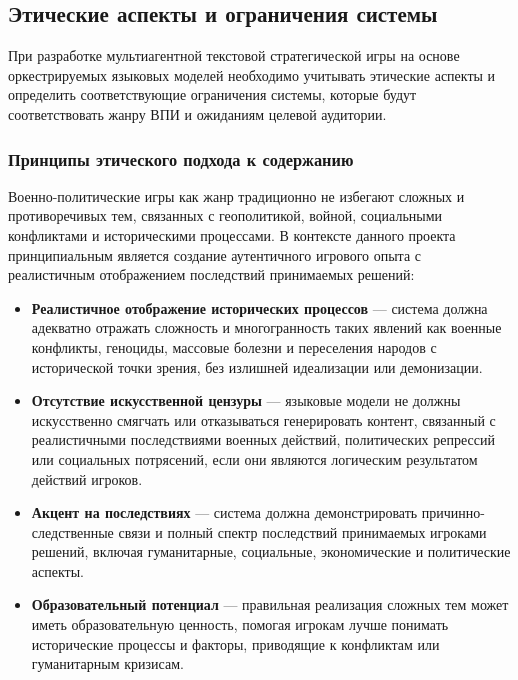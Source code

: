 \subsection{Этические аспекты и ограничения системы}

При разработке мультиагентной текстовой стратегической игры на основе оркестрируемых языковых моделей необходимо учитывать этические аспекты и определить соответствующие ограничения системы, которые будут соответствовать жанру ВПИ и ожиданиям целевой аудитории.

\subsubsection{Принципы этического подхода к содержанию}

Военно-политические игры как жанр традиционно не избегают сложных и противоречивых тем, связанных с геополитикой, войной, социальными конфликтами и историческими процессами. В контексте данного проекта принципиальным является создание аутентичного игрового опыта с реалистичным отображением последствий принимаемых решений:

\begin{itemize}
    \item \textbf{Реалистичное отображение исторических процессов} — система должна адекватно отражать сложность и многогранность таких явлений как военные конфликты, геноциды, массовые болезни и переселения народов с исторической точки зрения, без излишней идеализации или демонизации.

    \item \textbf{Отсутствие искусственной цензуры} — языковые модели не должны искусственно смягчать или отказываться генерировать контент, связанный с реалистичными последствиями военных действий, политических репрессий или социальных потрясений, если они являются логическим результатом действий игроков.

    \item \textbf{Акцент на последствиях} — система должна демонстрировать причинно-следственные связи и полный спектр последствий принимаемых игроками решений, включая гуманитарные, социальные, экономические и политические аспекты.

    \item \textbf{Образовательный потенциал} — правильная реализация сложных тем может иметь образовательную ценность, помогая игрокам лучше понимать исторические процессы и факторы, приводящие к конфликтам или гуманитарным кризисам.
\end{itemize}

